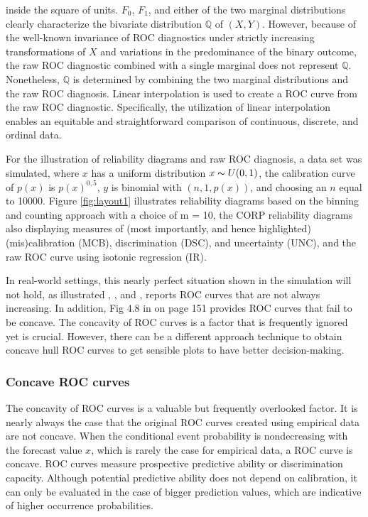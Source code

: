 \documentclass[a4paper,12pt]{article}
\numberwithin{equation}{section}
\begin{document}
   inside the square of units. $F_{0}$, $F_{1}$, and either of the two marginal distributions clearly characterize the bivariate distribution $\mathbb{Q}$ of $(X, Y)$. However, because of the well-known invariance of ROC diagnostics under strictly increasing transformations of $X$ and variations in the predominance of the binary outcome, the raw ROC diagnostic combined with a single marginal does not represent $\mathbb{Q}$. Nonetheless, $\mathbb{Q}$ is determined by combining the two marginal distributions and the raw ROC diagnosis.\bigskip
   \newpage
   Linear interpolation is used to create a ROC curve from the raw ROC diagnostic. Specifically, the utilization of linear interpolation enables an equitable and straightforward comparison of continuous, discrete, and ordinal data.\bigskip

   For the illustration of reliability diagrams and raw ROC diagnosis, a data set was simulated, where $x$ has a uniform distribution $x \thicksim  U(0,1)$, the calibration curve of $p(x)$ is $p(x)^{0,5}$, $y$ is binomial with $(n, 1, p(x))$, and choosing an $n$ equal to 10000. Figure \ref{fig:layout1} illustrates reliability diagrams based on the binning and counting approach with a choice of m = 10, the CORP reliability diagrams also displaying measures of (most importantly, and hence highlighted) (mis)calibration (MCB), discrimination (DSC), and uncertainty (UNC), and the raw ROC curve using isotonic regression (IR). \bigskip

   In real-world settings, this nearly perfect situation shown in the simulation will not hold, as illustrated \cite{roc2}, \cite{roc3}, and \cite{roc1}, reports ROC curves that are not always increasing. In addition, Fig 4.8 in \cite{statistical} on page 151 provides ROC curves that fail to be concave. The concavity of ROC curves is a factor that is frequently ignored yet is crucial. However, there can be a different approach technique to obtain concave hull ROC curves to get sensible plots to have better decision-making.

   \subsubsection{Concave ROC curves }
   The concavity of ROC curves is a valuable but frequently overlooked factor. It is nearly always the case that the original ROC curves created using empirical data are not concave. When the conditional event probability is nondecreasing with the forecast value $x$, which is rarely the case for empirical data, a ROC curve is concave. ROC curves measure prospective predictive ability or discrimination capacity. Although potential predictive ability does not depend on calibration, it can only be evaluated in the case of bigger prediction values, which are indicative of higher occurrence probabilities. \bigskip
\end{document}
